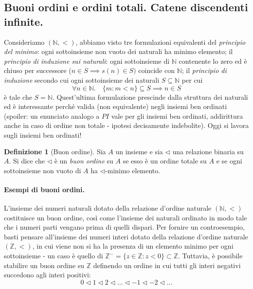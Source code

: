 \documentclass[fontsize = 11 pt, paper=A4, oneside, index=totoc, hyperref]{article}
\theoremstyle{definition}
\newtheorem{dfn}{Definizione}[section]
\theoremstyle{plain}
\newcommand{\N}{\mathbb{N}}
\begin{document}
\subsection{Buoni ordini e ordini totali. Catene discendenti infinite.}

Consideriamo \((\N, <)\), abbiamo visto tre formulazioni equivalenti del \emph{principio del minimo}: ogni sottoinsieme non vuoto dei naturali ha minimo elemento; il \emph{principio di induzione sui naturali}: ogni sottoinsieme di \(\N\) contenente lo zero ed è chiuso per successore (\(n \in S \implies s(n) \in S)\) coincide con \(\N\); il \emph{principio di induzione} secondo cui ogni sottoinsieme dei naturali \(S \subseteq \N\) per cui
\begin{equation}
  \forall n \in \N.\quad \lbrace m \colon m < n\rbrace \subseteq S \implies n \in S
\end{equation}
è tale che \(S = \N\). Quest'ultima formulazione prescinde dalla struttura dei naturali ed è interessante perché valida (non equivalente) negli insiemi ben ordinati (spoiler: un enunciato analogo a \(PI\) vale per gli insiemi ben ordinati, addirittura anche in caso di ordine non totale - ipotesi decisamente indebolite). Oggi si lavora sugli insiemi ben ordinati!

\begin{dfn}[Buon ordine]
  Sia \(A\) un insieme e sia \(\lhd\) una relazione binaria su \(A\). Si dice che \(\lhd\) è un \emph{buon ordine} su \(A\) se esso è un ordine totale su \(A\) e se ogni sottoinsieme non vuoto di \(A\) ha \(\lhd\)-minimo elemento.
\end{dfn}

\paragraph{Esempi di buoni ordini.} L'insieme dei numeri naturali dotato della relazione d'ordine naturale \((\N, <)\) costituisce un buon ordine, così come l'insieme dei naturali ordinato in modo tale che i numeri parti vengano prima di quelli dispari. Per fornire un controesempio, basti pensare all'insieme dei numeri interi dotato della relazione d'ordine naturale \((\mathbb{Z}, <)\), in cui viene non si ha la presenza di un elemento minimo per ogni sottoinsieme - un caso è quello di \(\mathbb{Z}^- = \lbrace z \in \mathbb{Z} \colon z < 0 \rbrace \subset \mathbb{Z}\). Tuttavia, è possibile stabilire un buon ordine su \(\mathbb{Z}\) definendo un ordine in cui tutti gli interi negativi succedono agli interi positivi:
\[
0 \lhd 1 \lhd 2 \lhd \dots \lhd -1 \lhd -2 \lhd \dots
\]
\end{document}
